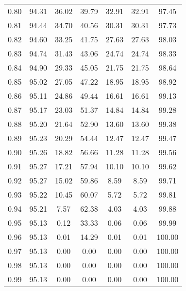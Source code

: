 \begin{tabular}{|c|c|c|c|c|c|c|}
      0.80 &     94.31 &     36.02 &      39.79 &   32.91 &      32.91 &         97.45 \\
      0.81 &     94.44 &     34.70 &      40.56 &   30.31 &      30.31 &         97.73 \\
      0.82 &     94.60 &     33.25 &      41.75 &   27.63 &      27.63 &         98.03 \\
      0.83 &     94.74 &     31.43 &      43.06 &   24.74 &      24.74 &         98.33 \\
      0.84 &     94.90 &     29.33 &      45.05 &   21.75 &      21.75 &         98.64 \\
      0.85 &     95.02 &     27.05 &      47.22 &   18.95 &      18.95 &         98.92 \\
      0.86 &     95.11 &     24.86 &      49.44 &   16.61 &      16.61 &         99.13 \\
      0.87 &     95.17 &     23.03 &      51.37 &   14.84 &      14.84 &         99.28 \\
      0.88 &     95.20 &     21.64 &      52.90 &   13.60 &      13.60 &         99.38 \\
      0.89 &     95.23 &     20.29 &      54.44 &   12.47 &      12.47 &         99.47 \\
      0.90 &     95.26 &     18.82 &      56.66 &   11.28 &      11.28 &         99.56 \\
      0.91 &     95.27 &     17.21 &      57.94 &   10.10 &      10.10 &         99.62 \\
      0.92 &     95.27 &     15.02 &      59.86 &    8.59 &       8.59 &         99.71 \\
      0.93 &     95.22 &     10.45 &      60.07 &    5.72 &       5.72 &         99.81 \\
      0.94 &     95.21 &      7.57 &      62.38 &    4.03 &       4.03 &         99.88 \\
      0.95 &     95.13 &      0.12 &      33.33 &    0.06 &       0.06 &         99.99 \\
      0.96 &     95.13 &      0.01 &      14.29 &    0.01 &       0.01 &        100.00 \\
      0.97 &     95.13 &      0.00 &       0.00 &    0.00 &       0.00 &        100.00 \\
      0.98 &     95.13 &      0.00 &       0.00 &    0.00 &       0.00 &        100.00 \\
      0.99 &     95.13 &      0.00 &       0.00 &    0.00 &       0.00 &        100.00 \\
\bottomrule
\end{tabular}
